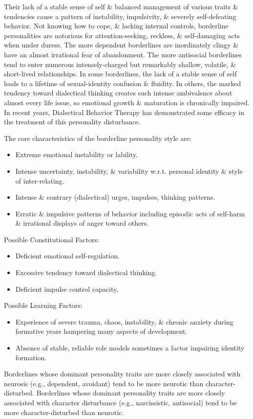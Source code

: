 \documentclass{article}
\numberwithin{equation}{section}
\begin{document}
Their lack of a stable sense of self \& balanced management of various traits \& tendencies cause a pattern of instability, impulsivity, \& severely self-defeating behavior. Not knowing how to cope, \& lacking internal controls, borderline personalities are notorious for attention-seeking, reckless, \& self-damaging acts when under duress. The more dependent borderlines are inordinately clingy \& have an almost irrational fear of abandonment. The more antisocial borderlines tend to enter numerous intensely-charged but remarkably shallow, volatile, \& short-lived relationships. In some borderlines, the lack of a stable sense of self leads to a lifetime of sexual-identity confusion \& fluidity. In others, the marked tendency toward dialectical thinking creates such intense ambivalence about almost every life issue, so emotional growth \& maturation is chronically impaired. In recent years, Dialectical Behavior Therapy has demonstrated some efficacy in the treatment of this personality disturbance.

The core characteristics of the borderline personality style are:
\begin{itemize}
	\item Extreme emotional instability or lability.
	\item Intense uncertainty, instability, \& variability w.r.t. personal identity \& style of inter-relating.
	\item Intense \& contrary (dialectical) urges, impulses, thinking patterns.
	\item Erratic \& impulsive patterns of behavior including episodic acts of self-harm \& irrational displays of anger toward others.
\end{itemize}
Possible Constitutional Factors:
\begin{itemize}
	\item Deficient emotional self-regulation.
	\item Excessive tendency toward dialectical thinking.
	\item Deficient impulse control capacity.
\end{itemize}
Possible Learning Factors:
\begin{itemize}
	\item Experience of severe trauma, chaos, instability, \& chronic anxiety during formative years hampering many aspects of development.
	\item Absence of stable, reliable role models sometimes a factor impairing identity formation.
\end{itemize}
Borderlines whose dominant personality traits are more closely associated with neurosis (e.g., dependent, avoidant) tend to be more neurotic than character-disturbed. Borderlines whose dominant personality traits are more closely associated with character disturbance (e.g., narcissistic, antisocial) tend to be more character-disturbed than neurotic.
\end{document}
